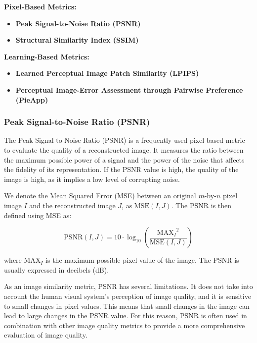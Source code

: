 \textbf{Pixel-Based Metrics:}

\begin{itemize}
  \item[$\circ$] \textbf{Peak Signal-to-Noise Ratio (PSNR)}
  \item[$\circ$] \textbf{Structural Similarity Index (SSIM)}
\end{itemize}

\textbf{Learning-Based Metrics:}

\begin{itemize}
  \item[$\circ$] \textbf{Learned Perceptual Image Patch Similarity (LPIPS)}
  \item[$\circ$] \textbf{Perceptual Image-Error Assessment through Pairwise Preference (PieApp)}
\end{itemize}


\subsubsection{Peak Signal-to-Noise Ratio (PSNR)}

The Peak Signal-to-Noise Ratio (PSNR) is a frequently used pixel-based metric to evaluate the quality of a reconstructed image. It measures the ratio between the maximum possible power of a signal and the power of the noise that affects the fidelity of its representation. If the PSNR value is high, the quality of the image is high, as it implies a low level of corrupting noise.

We denote the Mean Squared Error (MSE) between an original $m$-by-$n$ pixel image $I$ and the reconstructed image $J$, as $\text{MSE}(I, J)$. The PSNR is then defined using MSE as:

\begin{equation}
    \text{PSNR}(I, J) = 10 \cdot \log_{10} \left( \frac{{\text{MAX}_I}^2}{\text{MSE}(I, J)} \right)
    \label{eq:psnr}
\end{equation}

where $\text{MAX}_I$ is the maximum possible pixel value of the image. The PSNR is usually expressed in decibels (dB).

As an image similarity metric, PSNR has several limitations. It does not take into account the human visual system's perception of image quality, and it is sensitive to small changes in pixel values. This means that small changes in the image can lead to large changes in the PSNR value. For this reason, PSNR is often used in combination with other image quality metrics to provide a more comprehensive evaluation of image quality.

